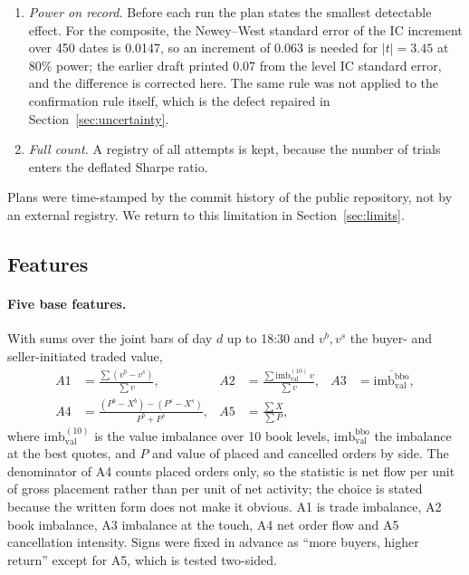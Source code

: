 \begin{enumerate}[label=(\roman*)]
\item \emph{Power on record.} Before each run the plan states the smallest detectable effect. For the composite, the Newey--West standard error of the IC increment over 450 dates is 0.0147, so an increment of 0.063 is needed for $|t|=3.45$ at 80\% power; the earlier draft printed 0.07 from the level IC standard error, and the difference is corrected here. The same rule was not applied to the confirmation rule itself, which is the defect repaired in Section~\ref{sec:uncertainty}.
\item \emph{Full count.} A registry of all attempts is kept, because the number of trials enters the deflated Sharpe ratio.
\end{enumerate}
Plans were time-stamped by the commit history of the public repository, not by an external registry. We return to this limitation in Section~\ref{sec:limits}.

\subsection{Features}

\paragraph{Five base features.} With sums over the joint bars of day $d$ up to 18:30 and $v^b,v^s$ the buyer- and seller-initiated traded value,
\begin{align}
A1&=\frac{\sum (v^b-v^s)}{\sum v}, & A2&=\frac{\sum \mathrm{imb}^{(10)}_{\mathrm{val}}\,v}{\sum v}, & A3&=\overline{\mathrm{imb}^{\mathrm{bbo}}_{\mathrm{val}}},\\
A4&=\frac{(P^b-X^b)-(P^s-X^s)}{P^b+P^s}, & A5&=\frac{\sum X}{\sum P},
\end{align}
where $\mathrm{imb}^{(10)}_{\mathrm{val}}$ is the value imbalance over 10 book levels, $\mathrm{imb}^{\mathrm{bbo}}_{\mathrm{val}}$ the imbalance at the best quotes, and $P$ and  value of placed and cancelled orders by side. The denominator of A4 counts placed orders only, so the statistic is net flow per unit of gross placement rather than per unit of net activity; the choice is stated because the written form does not make it obvious. A1 is trade imbalance, A2 book imbalance, A3 imbalance at the touch, A4 net order flow and A5 cancellation intensity. Signs were fixed in advance as ``more buyers, higher return'' except for A5, which is tested two-sided.


